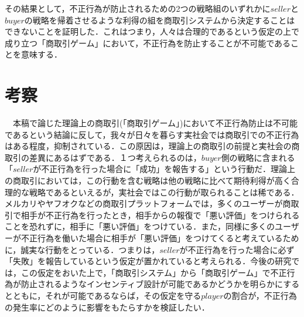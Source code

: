 \documentclass[twocolumn, a4j]{article}
\begin{document}
  その結果として，不正行為が防止されるための2つの戦略組のいずれかに$seller$と$buyer$の戦略を帰着させるような利得の組を商取引システムから決定することはできないことを証明した．これはつまり，人々は合理的であるという仮定の上で成り立つ「商取引ゲーム」において，不正行為を防止することが不可能であることを意味する．


\section*{考察}
　本稿で論じた理論上の商取引(「商取引ゲーム」)において不正行為防止は不可能であるという結論に反して，我々が日々を暮らす実社会では商取引での不正行為はある程度，抑制されている．この原因は，理論上の商取引の前提と実社会の商取引の差異にあるはずである．１つ考えられるのは，$buyer$側の戦略に含まれる「$seller$が不正行為を行った場合に「成功」を報告する」という行動だ．理論上の商取引においては，この行動を含む戦略は他の戦略に比べて期待利得が高く合理的な戦略であるといえるが，実社会ではこの行動が取られることは稀である．メルカリやヤフオクなどの商取引プラットフォームでは，多くのユーザーが商取引で相手が不正行為を行ったとき，相手からの報復で「悪い評価」をつけられることを恐れずに，相手に「悪い評価」をつけている．また，同様に多くのユーザーが不正行為を働いた場合に相手が「悪い評価」をつけてくると考えているために，誠実な行動をとっている．つまりは，$seller$が不正行為を行った場合に必ず「失敗」を報告しているという仮定が置かれていると考えられる．今後の研究では，この仮定をおいた上で，「商取引システム」から「商取引ゲーム」で不正行為が防止されるようなインセンティブ設計が可能であるかどうかを明らかにするとともに，それが可能であるならば，その仮定を守る$player$の割合が，不正行為の発生率にどのように影響をもたらすかを検証したい．

%
\end{document}
